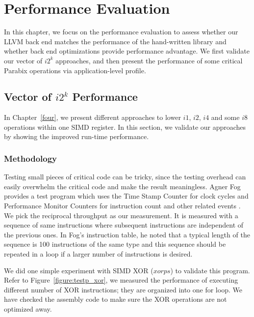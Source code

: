 %
%

\chapter{Performance Evaluation}
\label{six}

In this chapter, we focus on the performance evaluation to assess whether our LLVM back end matches the performance of the hand-written library and whether back end optimizations provide performance advantage. We first validate our vector of $i2^k$ approaches, and then present the performance of some critical Parabix operations via application-level profile.

\section{Vector of $i2^k$ Performance}
In Chapter~\ref{four}, we present different approaches to lower $i1$, $i2$, $i4$ and some $i8$ operations within one SIMD register. In this section, we validate our approaches by showing the improved run-time performance.

\subsection{Methodology}

Testing small pieces of critical code can be tricky, since the testing overhead can easily overwhelm the critical code and make the result meaningless. Agner Fog provides a test program which uses the Time Stamp Counter for clock cycles and Performance Monitor Counters for instruction count and other related events \cite{agner_testp}. We pick the reciprocal throughput as our measurement. It is measured with a sequence of same instructions where subsequent instructions are independent of the previous ones. In Fog's instruction table, he noted that a typical length of the sequence is 100 instructions of the same type and this sequence should be repeated in a loop if a larger number of instructions is desired.

We did one simple experiment with SIMD XOR ($xorps$) to validate this program. Refer to Figure~\ref{figure:testp_xor}, we measured the performance of executing different number of XOR instructions; they are organized into one for loop. We have checked the assembly code to make sure the XOR operations are not optimized away.


